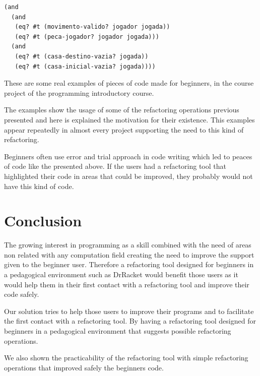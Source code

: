 \begin{lstlisting}[basicstyle=\ttfamily, caption="Refactoring and expression"]
(and
  (and
   (eq? #t (movimento-valido? jogador jogada))
   (eq? #t (peca-jogador? jogador jogada)))
  (and
   (eq? #t (casa-destino-vazia? jogada))
   (eq? #t (casa-inicial-vazia? jogada))))
\end{lstlisting}


These are some real examples of pieces of code made for beginners, in the course
project of the programming introductory course.



The examples show the usage of some of the refactoring operations previous presented
and here is explained the motivation for their existence.
This examples appear repeatedly in almost every project supporting the need to
this kind of refactoring.

Beginners often use error and trial approach in code writing which led %
to peaces of code like the presented above.
If the users had a refactoring tool that highlighted their code in areas that
could be improved, they probably would not have this kind of code.


\section{Conclusion}



The growing interest in programming as a skill combined with the need of areas
non related with any computation field creating the need to improve the support
given to the beginner user. %
Therefore a refactoring tool designed for beginners in a pedagogical environment such as DrRacket %
 would benefit those users as it would help them in their first contact with a
 refactoring tool and improve their code safely. %

Our solution tries to help those users to improve their programs and to facilitate
the first contact with a refactoring tool.
By having a refactoring tool designed for beginners in a pedagogical environment
that suggests possible refactoring operations.

We also shown the practicability of the refactoring tool with simple refactoring operations
that improved safely the beginners code.

